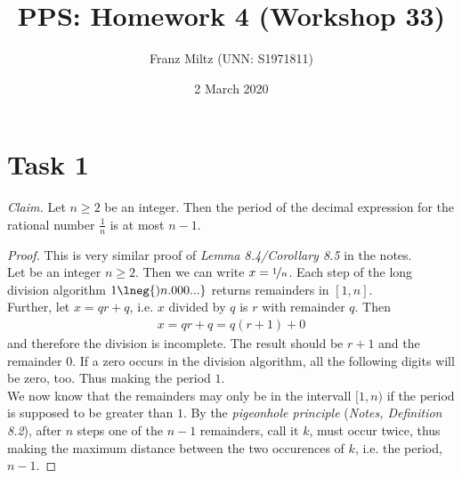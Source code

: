 \documentclass{article}
\title{PPS: Homework 4 (Workshop 33)}
\author{Franz Miltz (UNN: S1971811)}
\date{2 March 2020}
\begin{document}
\maketitle
\section*{Task 1}
\emph{Claim.} Let $n\geq 2$ be an integer. Then the period of the decimal expression for the rational number $\frac{1}{n}$ is at most $n-1$.
\begin{proof}
This is very similar proof of \emph{Lemma 8.4/Corollary 8.5} in the notes.\\
Let be an integer $n\geq 2$. Then we can write $x=\nicefrac{1}{n}$. Each step of the long division algorithm $1\lneg{)n.000...}$ returns remainders in $[1,n]$.\\
Further, let $x=qr+q$, i.e. $x$ divided by $q$ is $r$ with remainder $q$. Then
\begin{align*}
  x = qr+q = q(r+1)+0
\end{align*}
and therefore the division is incomplete. The result should be $r+1$ and the remainder $0$. If a zero occurs in the division algorithm, all the following digits will be zero, too. Thus making the period $1$.\\
We now know that the remainders may only be in the intervall $[1, n)$ if the period is supposed to be greater than $1$. By the \emph{pigeonhole principle} (\emph{Notes, Definition 8.2}), after $n$ steps one of the $n-1$ remainders, call it $k$, must occur twice, thus making the maximum distance between the two occurences of $k$, i.e. the period, $n-1$.
 
\end{proof}
\end{document}
